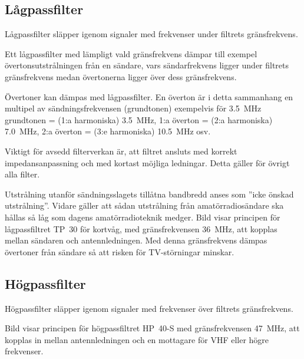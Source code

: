 \subsection{Lågpassfilter}
\label{Lågpassfilter}


Lågpassfilter släpper igenom signaler med frekvenser under filtrets
gränsfrekvens.

Ett lågpassfilter med lämpligt vald gränsfrekvens dämpar till exempel
övertonsutstrålningen från en sändare, vars sändarfrekvens ligger under filtrets
gränsfrekvens medan övertonerna ligger över dess gränsfrekvens.

Övertoner kan dämpas med lågpassfilter.
En överton är i detta sammanhang en multipel av sändningsfrekvensen
(grundtonen) exempelvis för
\SI{3,5}{\mega\hertz} grundtonen = (1:a harmoniska) \SI{3,5}{\mega\hertz},
1:a överton = (2:a harmoniska) \SI{7,0}{\mega\hertz},
2:a överton = (3:e harmoniska) \SI{10,5}{\mega\hertz} osv.

Viktigt för avsedd filterverkan är, att filtret ansluts med korrekt
impedansanpassning och med kortast möjliga ledningar.
Detta gäller för övrigt alla filter.

Utstrålning utanför sändningsslagets tillåtna bandbredd anses som
''icke önskad utstrålning''.
Vidare gäller att sådan utstrålning från amatörradiosändare ska hållas så låg
som dagens amatörradioteknik medger.
Bild  visar principen för lågpassfiltret TP~30 för kortvåg,
med gränsfrekvensen \SI{36}{\mega\hertz}, att kopplas mellan sändaren och
antennledningen.
Med denna gränsfrekvens dämpas övertoner från sändare så att risken för
TV-störningar minskar.


\newpage
\subsection{Högpassfilter}
\label{Högpassfilter}

Högpassfilter släpper igenom signaler med frekvenser över filtrets
gränsfrekvens.

Bild  visar principen för högpassfiltret HP~40-S med
gränsfrekvensen \SI{47}{\mega\hertz}, att kopplas in mellan antennledningen och
en mottagare för VHF eller högre frekvenser.

